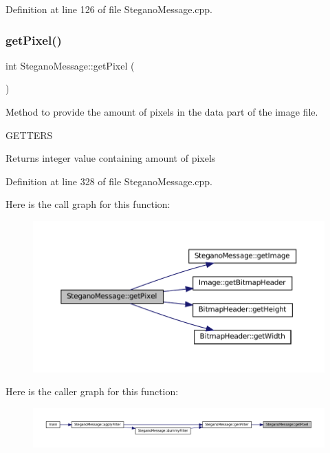 Definition at line 126 of file Stegano\+Message.\+cpp.

\mbox{\label{classSteganoMessage_a12231d3596b90fe4c6d67bd694b27d07}} 
\subsubsection{\texorpdfstring{getPixel()}{getPixel()}}
{\footnotesize\ttfamily int Stegano\+Message\+::get\+Pixel (\begin{DoxyParamCaption}{ }\end{DoxyParamCaption})\hspace{0.3cm}{\ttfamily [private]}}



Method to provide the amount of pixels in the data part of the image file. 

G\+E\+T\+T\+E\+RS\begin{DoxyReturn}{Returns}
integer value containing amount of pixels 
\end{DoxyReturn}


Definition at line 328 of file Stegano\+Message.\+cpp.

Here is the call graph for this function\+:
\nopagebreak
\begin{figure}[H]
\begin{center}
\leavevmode
\includegraphics[width=350pt]{classSteganoMessage_a12231d3596b90fe4c6d67bd694b27d07_cgraph}
\end{center}
\end{figure}
Here is the caller graph for this function\+:
\nopagebreak
\begin{figure}[H]
\begin{center}
\leavevmode
\includegraphics[width=350pt]{classSteganoMessage_a12231d3596b90fe4c6d67bd694b27d07_icgraph}
\end{center}
\end{figure}
\mbox{\label{classSteganoMessage_aeb4d2b69498c148508e2ca70194679cc}} 
